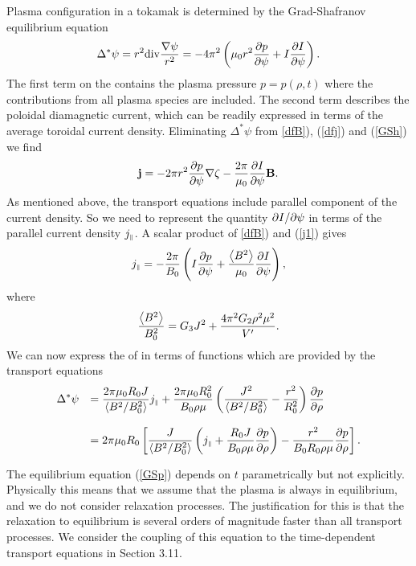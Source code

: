 Plasma configuration in a tokamak is determined by the Grad-Shafranov
equilibrium equation 
\begin{equation}
\label{GSh}
\Delta^*\psi
=r^2{\rm div}\frac{\nabla\psi}{r^2}
=-4\pi^2\left(\mu_0 r^2\displaystyle{\partial p\over\partial \psi}+I\displaystyle{\partial I\over\partial \psi}\right)
.\end{equation}
The first term on the \rhs  contains the plasma pressure $p=p(\rho,t)$
where the contributions from all plasma species are included. The second
term describes the poloidal diamagnetic current, which can be readily
expressed in terms of the average toroidal current density. 
Eliminating $\Delta^*\psi$ from \eqs\ref{dfB}), (\ref{dfj}) and
(\ref{GSh}) we find
\begin{equation}\label{j1}
{\bf j}
=-2\pi r^2\displaystyle{\partial p\over\partial \psi}\nabla\zeta-\frac{2\pi}{\mu_0}\displaystyle{\partial I\over\partial \psi}{\bf B}
.\end{equation}
As mentioned above, the transport equations include parallel component
of the current density. 
So we need to represent the quantity $\partial I/\partial\psi$ in terms of the
parallel current density $j_{\scriptscriptstyle\parallel}$. 
A scalar product of \eqs\ref{dfB}) and (\ref{j1}) gives
\begin{equation}\label{j2}
j_{\scriptscriptstyle\parallel}
=-\frac{2\pi}{B_0}\left(I\displaystyle{\partial p\over\partial \psi}
+\frac{\left<B^2\right>}{\mu_0}\displaystyle{\partial I\over\partial \psi}\right)
,\end{equation}
where
\begin{equation}
\frac{\left<B^2\right>}{B_0^2}
=G_3 J^2+\frac{4\pi^2 G_2\rho^2 \mu^2}{V'}
.\end{equation}
We can now express the \rhs of  in terms of functions which are
provided by the transport equations 
\begin{equation}\label{GSp}
\begin{array}{rl}\dstyle
\Delta^*\psi
&\dstyle
=\frac{2\pi\mu_0 R_0 J}{\av{B^2/B_0^2}}j_\pll
+\frac{2\pi\mu_0R_0^2}{B_0\rho\mu}\lb(\frac{J^2}{\av{B^2/B_0^2}}
-\frac{r^2}{R_0^2}\rb)\prti{p}{\rho}
\bigskip \\ &\dstyle
=2\pi\mu_0 R_0\lb[
\frac{J}{\av{B^2/B_0^2}}\lb(j_\pll
+\frac{R_0 J}{B_0\rho\mu}\prti{p}{\rho}\rb)
-\frac{r^2}{B_0 R_0\rho\mu}\prti{p}{\rho}\rb]
.\end{array}
\end{equation}

The equilibrium equation (\ref{GSp}) depends on $t$ parametrically but
not explicitly.  
Physically this means that we assume that the plasma is always in 
equilibrium, and we do not consider relaxation processes. 
The justification for this is that the relaxation to equilibrium is
several orders of magnitude faster than all transport processes. 
We consider the coupling of this equation to the time-dependent transport
equations in Section 3.11. 

